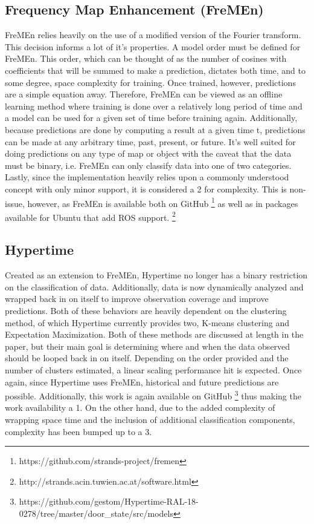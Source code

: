   \subsection { Frequency Map Enhancement (FreMEn) }
  FreMEn relies heavily on the use of a modified version of the Fourier
  transform. This decision informs a lot of it's properties. A model order must
  be defined for FreMEn. This order, which can be thought of as the number of
  cosines with coefficients that will be summed to make a prediction, dictates
  both time, and to some degree, space complexity for training. Once trained,
  however, predictions are a simple equation away. Therefore, FreMEn can be
  viewed as an offline learning method where training is done over a relatively
  long period of time and a model can be used for a given set of time before
  training again. Additionally, because predictions are done by computing a
  result at a given time t, predictions can be made at any arbitrary time,
  past, present, or future. It's well suited for doing predictions on any type
  of map or object with the caveat that the data must be binary, i.e. FreMEn
  can only classify data into one of two categories. Lastly, since the
  implementation heavily relies upon a commonly understood concept with only
  minor support, it is considered a 2 for complexity. This is non-issue,
  however, as FreMEn is available both on
  GitHub \footnote[0]{https://github.com/strands-project/fremen}
  as well as in packages available for Ubuntu that add ROS
  support. \footnote[1]{http://strands.acin.tuwien.ac.at/software.html}


  \subsection { Hypertime }

  Created as an extension to FreMEn, Hypertime no longer has a binary restriction
  on the classification of data. Additionally, data is now dynamically analyzed
  and wrapped back in on itself to improve observation coverage and improve
  predictions. Both of these behaviors are heavily dependent on the clustering
  method, of which Hypertime currently provides two, K-means clustering and
  Expectation Maximization. Both of these methods are discussed at length in
  the paper, but their main goal is determining where and when the data observed
  should be looped back in on itself. Depending on the order provided and the
  number of clusters estimated, a linear scaling performance hit is expected.
  Once again, since Hypertime uses FreMEn, historical and future predictions
  are possible. Additionally, this work is again available on GitHub
  \footnote[2]{https://github.com/gestom/Hypertime-RAL-18-0278/tree/master/door\_state/src/models}
  thus making the work availability a 1. On the other hand, due to the added
  complexity of wrapping space time and the inclusion of additional classification
  components, complexity has been bumped up to a 3.

